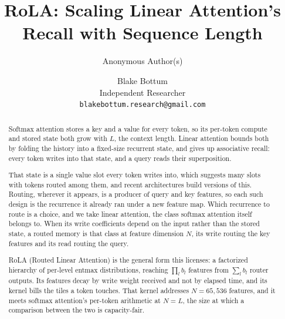 \documentclass{article}
\title{RoLA: Scaling Linear Attention's Recall with Sequence Length}
\author{Anonymous Author(s)}
\author{%
    Blake Bottum\\
    Independent Researcher\\
    \texttt{blakebottum.research@gmail.com}%
  }
\date{}
\theoremstyle{definition}
\newcommand{\Nst}{N}            %
\newcommand{\bl}{b_l}           %
\begin{document}
\maketitle

\begin{abstract}
Softmax attention stores a key and a value for every token, so its per-token compute and stored state both grow with $L$, the context length. Linear attention bounds both by folding the history into a fixed-size recurrent state, and gives up associative recall: every token writes into that state, and a query reads their superposition.

That state is a single value slot every token writes into, which suggests many slots with tokens routed among them, and recent architectures build versions of this. Routing, wherever it appears, is a producer of query and key features, so each such design is the recurrence it already ran under a new feature map. Which recurrence to route is a choice, and we take linear attention, the class softmax attention itself belongs to. When its write coefficients depend on the input rather than the stored state, a routed memory is that class at feature dimension $\Nst$, its write routing the key features and its read routing the query.

RoLA (Routed Linear Attention) is the general form this licenses: a factorized hierarchy of per-level entmax distributions, reaching $\prod_l \bl$ features from $\sum_l \bl$ router outputs. Its features decay by write weight received and not by elapsed time, and its kernel bills the tiles a token touches. That kernel addresses $\Nst = 65{,}536$ features, and it meets softmax attention's per-token arithmetic at $\Nst = L$, the size at which a comparison between the two is capacity-fair. 
\end{abstract}











\end{document}
